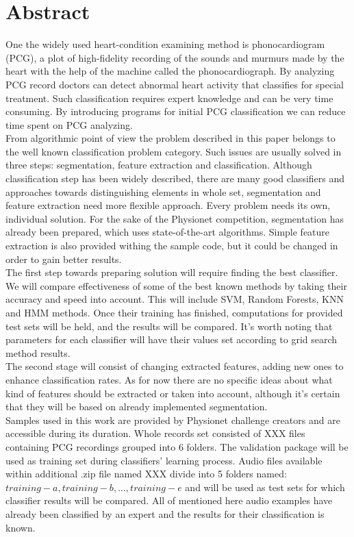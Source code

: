\documentclass[10pt,a4paper]{article}
\begin{document}
\section{Abstract}
One the widely used heart-condition examining method is phonocardiogram (PCG), a plot of high-fidelity recording of the sounds and murmurs made by the heart with the help of the machine called the phonocardiograph. By analyzing PCG record doctors can detect abnormal heart activity that classifies for special treatment. Such classification requires expert knowledge and can be very time consuming. By introducing programs for initial PCG classification we can reduce time spent on PCG analyzing. \\

From algorithmic point of view the problem described in this paper belongs to the well known classification problem category. Such issues are usually solved in three steps: segmentation, feature extraction and classification. Although classification step has been widely described, there are many good classifiers and approaches towards distinguishing elements in whole set, segmentation and feature extraction need more flexible approach. Every problem needs its own, individual solution. For the sake of the Physionet competition, segmentation has already been prepared, which uses state-of-the-art algorithms. Simple feature extraction is also provided withing the sample code, but it could be changed in order to gain better results. \\

The first step towards preparing solution will require finding the best classifier. We will compare effectiveness of some of the best known methods by taking their accuracy and speed into account. This will include SVM, Random Forests, KNN and HMM methods. Once their training has finished, computations for provided test sets will be held, and the results will be compared. It's worth noting that parameters for each classifier will have their values set according to grid search method results. \\

The second stage will consist of changing extracted features, adding new ones to enhance classification rates. As for now there are no specific ideas about what kind of features should be extracted or taken into account, although it's certain that they will be based on already implemented segmentation. \\

Samples used in this work are provided by Physionet challenge creators and are accessible during its duration. Whole records set consisted of XXX files containing PCG recordings grouped into 6 folders. The validation package will be used as training set during classifiers' learning process. Audio files available within additional .zip file named XXX divide into 5 folders named: $training-a, training-b, \dots, training-e$ and will be used as test sets for which classifier results will be compared. All of mentioned here audio examples have already been classified by an expert and the results for their classification is known.
\end{document}
